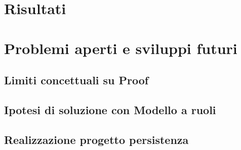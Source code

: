 \section{Risultati}


\section{Problemi aperti e sviluppi futuri}

	\subsection{Limiti concettuali su Proof}
	
	
	\subsection{Ipotesi di soluzione con Modello a ruoli}
	
	
	\subsection{Realizzazione progetto persistenza}
		
